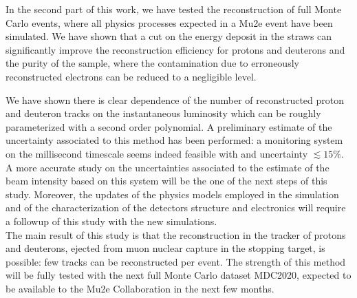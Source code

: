 \documentclass[12pt,a4paper,openright, oneside, titlepage]{book} %
\begin{document}
\noindent
In the second part of this work, we have tested the reconstruction of full Monte Carlo events, where all physics processes expected in a Mu2e event have been simulated.
We have shown that a cut on the energy deposit in the straws can significantly improve the reconstruction efficiency for protons and deuterons and the purity of the sample, where the contamination due to erroneously reconstructed electrons can be reduced to a negligible level. 

\noindent 
We have shown there is clear dependence of the number of reconstructed proton and deuteron tracks on the instantaneous luminosity which can be roughly parameterized with a second order polynomial.
A preliminary estimate of the uncertainty associated to this method has been performed: a monitoring system on the millisecond timescale seems indeed feasible with and uncertainty $\lesssim 15 \%$.
A more accurate study on the uncertainties associated to the estimate of the beam intensity based on this system will be the one of the next steps of this study.
Moreover, the updates of the physics models employed in the simulation and of the characterization of the detectors structure and electronics will require a followup of this study with the new simulations. \\
The main result of this study is that the reconstruction in the tracker of protons and deuterons, ejected from muon nuclear capture in the stopping target, is possible: few tracks can be reconstructed per event.
The strength of this method will be fully tested with the next full Monte Carlo dataset MDC2020, expected to be available to the Mu2e Collaboration in the next few months. 
\end{document}
